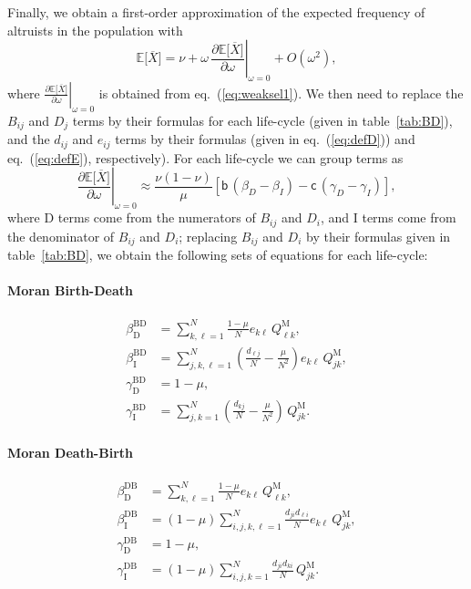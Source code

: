 \documentclass[11pt, letterpaper]{article}
\renewcommand{\eqref}[1]{\textup{{\normalfont eq.~(\ref{#1}}\normalfont)}}
\newcommand{\deriv}[2]{\partial_{#2}\!{#1}\,}
\newcommand{\derivv}[3]{\left.\frac{\partial #1}{\partial #2}\right |_{#3=0}} %
\newcommand{\Esp}[1]{\mathbb{E}\big[ #1\big]}%
\newcommand{\bigO}[1]{O\left( #1 \right)}
\newcommand{\bb}{\mathsf{b}}
\newcommand{\cc}{\mathsf{c}}
\newcommand{\direct}{\mathrm{D}}
\newcommand{\indirect}{\mathrm{I}}
\newcommand{\Moran}{\textrm{M}}
\newcommand{\BD}{\textrm{BD}}
\newcommand{\DB}{\textrm{DB}}
\newcommand{\mutbias}{\nu}
\begin{document}
Finally, we obtain a first-order approximation of the expected frequency of altruists in the population with 
\begin{equation}\label{eq:EXgeneric}
\Esp{\overline{X}} = \mutbias + \omega \,  \derivv{\Esp{\overline{X}}}{\omega}{\omega} + \bigO{\omega^2},
\end{equation}
where $\derivv{\Esp{\overline{X}}}{\omega}{\omega}$ is obtained from \eqref{eq:weaksel1}. We then need to replace the $B_{ij}$ and $D_{j}$ terms by their formulas for each life-cycle (given in table~\ref{tab:BD}), and the $d_{ij}$ and $e_{ij}$ terms by their formulas (given in \eqref{eq:defD}) and \eqref{eq:defE}, respectively). For each life-cycle we can group terms as
\begin{equation}
\derivv{\Esp{\overline{X}}}{\omega}{\omega} 
\approx 
\frac{\mutbias (1-\mutbias)}{\mu} \left[ \bb \, (\beta_{D} - \beta_{I}) - \cc \, (\gamma_{D} - \gamma_{I}) \right],
\end{equation}
%
where $\direct$ terms come from the numerators of $B_{ij}$ and $D_i$, and $\indirect$ terms come from the denominator of $B_{ij}$ and $D_i$; replacing $B_{ij}$ and $D_i$ by their formulas given in table~\ref{tab:BD}, we obtain the following sets of equations for each life-cycle:

\paragraph{Moran Birth-Death}
\begin{subequations}\label{eq:EXBDsums}
\begin{align}
\beta_{\direct}^{\BD} &= \sum_{k,\ell=1}^N \frac{1-\mu}{N} e_{k\ell} \, Q_{\ell k}^{\Moran},\\
%
\beta_{\indirect}^{\BD} &= \sum_{j,k,\ell=1}^N \left(  \frac{d_{\ell j}}{N } - \frac{\mu}{N^2}  \right)e_{k\ell} \, Q_{jk}^{\Moran},\\
%
\gamma_{\direct}^{\BD} &= 1-\mu,\\
%
\gamma_{\indirect}^{\BD} &= \sum_{j,k=1}^N \left(  \frac{d_{kj}}{N } - \frac{\mu}{N^2}   \right) \, Q_{jk}^{\Moran} .
\end{align}
\end{subequations}

\paragraph{Moran Death-Birth}\label{eq:EXDBsums}
\begin{subequations}
\begin{align}
\beta_{\direct}^{\DB} &= \sum_{k,\ell=1}^N \frac{1-\mu}{N} e_{k\ell} \, Q_{\ell k}^{\Moran},\\
%
\beta_{\indirect}^{\DB} &= (1-\mu) \sum_{i,j,k,\ell=1}^{N} \frac{ d_{ji} d_{\ell i}}{N}   e_{k\ell} \, Q_{jk}^{\Moran}, \\ 
%
\gamma_{\direct}^{\DB} &= 1-\mu,\\
%
\gamma_{\indirect}^{\DB} &= (1-\mu)\sum_{i,j,k=1}^N  \frac{ d_{ji} d_{ki}}{N }  \, Q_{jk}^{\Moran}.
\end{align}
\end{subequations}
\end{document}
